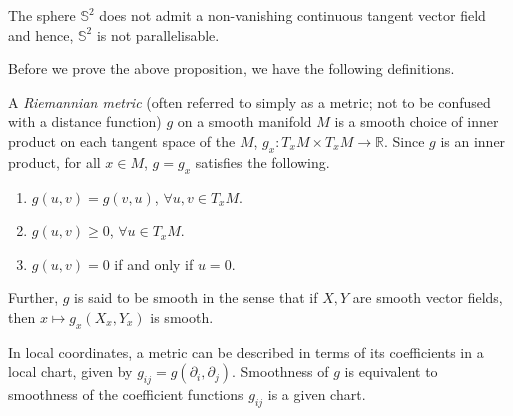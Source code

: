 \documentclass[12pt,a4paper]{article}
\begin{document}
\begin{proposition}
The sphere $\mathbb{S}^2$ does not admit a non-vanishing continuous tangent vector field and hence, $\mathbb{S}^2$ is not parallelisable.
\end{proposition}

%
%
Before we prove the above proposition, we have the following definitions.

\begin{definition}
A \textit{Riemannian metric} (often referred to simply as a metric; not to be confused with a distance function) $g$ on a smooth manifold $M$ is a smooth choice of inner product on each tangent space of the $M$, $g_x:T_xM\times T_xM\to\mathbb{R}$. Since $g$ is an inner product, for all $x\in M$, $g=g_x$ satisfies the following.
\begin{enumerate}
\item $g(u,v)=g(v,u)$, $\forall u,v\in T_xM$.
\item $g(u,v)\geq 0$, $\forall u\in T_xM$.
\item $g(u,v)=0$ if and only if $u=0$.
\end{enumerate}
Further, $g$ is said to be smooth in the sense that if $X,Y$ are smooth vector fields, then $x\mapsto g_x(X_x,Y_x)$ is smooth.

In local coordinates, a metric can be described in terms of its coefficients in a local chart, given by $g_{ij}=g(\partial_i,\partial_j)$. Smoothness of $g$ is equivalent to smoothness of the coefficient functions $g_{ij}$ is a given chart.
\end{definition}
\end{document}
